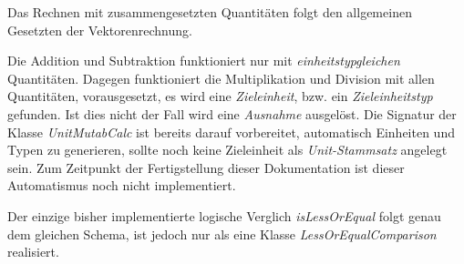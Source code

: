 Das Rechnen mit zusammengesetzten Quantitäten folgt den allgemeinen Gesetzten der Vektorenrechnung.

Die Addition und Subtraktion funktioniert nur mit \emph{einheitstypgleichen} Quantitäten. Dagegen funktioniert die Multiplikation und Division mit allen Quantitäten, vorausgesetzt, es wird eine \emph{Zieleinheit}, bzw. ein \emph{Zieleinheitstyp} gefunden. Ist dies nicht der Fall wird eine \emph{Ausnahme} ausgelöst. Die Signatur der Klasse 
\textit{UnitMutabCalc} ist bereits darauf vorbereitet, automatisch Einheiten und Typen zu generieren, sollte noch keine Zieleinheit als \emph{Unit-Stammsatz} angelegt sein. Zum Zeitpunkt der Fertigstellung dieser Dokumentation ist dieser Automatismus noch nicht implementiert.

Der einzige bisher implementierte logische Verglich \emph{isLessOrEqual} folgt genau dem gleichen Schema, ist jedoch nur als eine Klasse \textit{LessOrEqualComparison} realisiert.